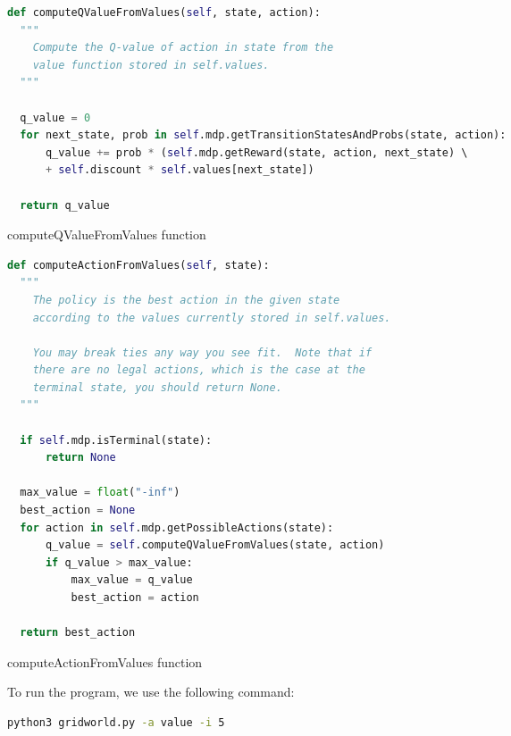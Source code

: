\documentclass{article}
\begin{document}
\begin{table} [ht!]
\begin{lstlisting}[language=python, frame=tlbr, framesep=6pt, backgroundcolor=\color{light-gray}]
def computeQValueFromValues(self, state, action):
  """
    Compute the Q-value of action in state from the
    value function stored in self.values.
  """

  q_value = 0
  for next_state, prob in self.mdp.getTransitionStatesAndProbs(state, action):
      q_value += prob * (self.mdp.getReward(state, action, next_state) \ 
      + self.discount * self.values[next_state])

  return q_value
\end{lstlisting}
\caption{computeQValueFromValues function}
\label{tab:computeQValueFromValues}
\end{table}

\begin{table} [ht!]
\begin{lstlisting}[language=python, frame=tlbr, framesep=6pt, backgroundcolor=\color{light-gray}]
def computeActionFromValues(self, state):
  """
    The policy is the best action in the given state
    according to the values currently stored in self.values.

    You may break ties any way you see fit.  Note that if
    there are no legal actions, which is the case at the
    terminal state, you should return None.
  """
  
  if self.mdp.isTerminal(state):
      return None

  max_value = float("-inf")
  best_action = None
  for action in self.mdp.getPossibleActions(state):
      q_value = self.computeQValueFromValues(state, action)
      if q_value > max_value:
          max_value = q_value
          best_action = action

  return best_action
\end{lstlisting}
\caption{computeActionFromValues function}
\label{tab:computeActionFromValues}
\end{table}
  
To run the program, we use the following command:

\hbox{}
  
\begin{lstlisting}[language=bash, frame=tlbr, framesep=6pt, backgroundcolor=\color{light-gray}]
  python3 gridworld.py -a value -i 5
\end{lstlisting}

\hbox{}
\end{document}
